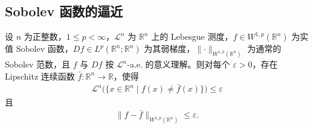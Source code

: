\documentclass[../../main.tex]{subfiles}%
\begin{document}
\subsection{Sobolev 函数的逼近}\label{subsection:ch06-06-3}

\begin{theorem}\label{theorem:ch06-6-14}
设 $n$ 为正整数，$1\le p<\infty$，$\mathcal{L}^n$ 为 $\mathbb{R}^n$ 上的 Lebesgue 测度，$f\in W^{1,p}(\mathbb{R}^n)$ 为实值 Sobolev 函数，$Df\in L^p(\mathbb{R}^n;\mathbb{R}^n)$ 为其弱梯度，$\lVert\cdot\rVert_{W^{1,p}(\mathbb{R}^n)}$ 为通常的 Sobolev 范数，且 $f$ 与 $Df$ 按 $\mathcal{L}^n$-a.e. 的意义理解。则对每个 $\varepsilon>0$，存在 Lipschitz 连续函数 $\bar f:\mathbb{R}^n\to\mathbb{R}$，使得
\begin{align*}
\mathcal{L}^n\bigl(\{x\in\mathbb{R}^n\mid f(x)\ne\bar f(x)\}\bigr)\le\varepsilon
\end{align*}
且
\begin{align*}
\lVert f-\bar f\rVert_{W^{1,p}(\mathbb{R}^n)}\le\varepsilon .
\end{align*}
\end{theorem}
\end{document}
